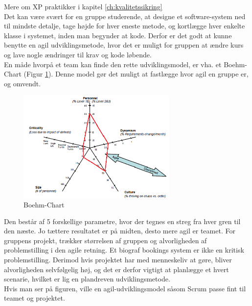 Mere om XP praktikker i kapitel \ref{ch:kvalitetssikring}\\

Det kan være svært for en gruppe studerende, at designe et software-system ned til mindste detalje, 
tage højde for hver eneste metode, og kortlægge hver enkelte klasse i systemet, inden man begynder at kode. 
Derfor er det godt at kunne benytte en agil udviklingsmetode, hvor det er muligt for gruppen at ændre kurs og 
lave nogle ændringer til krav og kode løbende. \\
En måde hvorpå et team kan finde den rette udviklingsmodel, er vha. et Boehm-Chart (Figur \ref{fig:Boehm}). 
Denne model gør det muligt at fastlægge hvor agil en gruppe er, og omvendt. \\

\begin{figure}[h]
    \centering
    \includegraphics[width=0.7\textwidth]{figures/Boehm-chart.png}
    \caption{Boehm-Chart}
    \label{fig:Boehm}
\end{figure}

Den består af 5 forskellige parametre, hvor der tegnes en streg fra hver gren til den næste. 
Jo tættere resultatet er på midten, desto mere agil er teamet. 
For gruppens projekt, trækker størrelsen af gruppen og alvorligheden af problemstilling i den agile retning. 
Et biograf bookings system er ikke en kritisk problemstilling. Derimod hvis projektet har med menneskeliv at gøre, 
bliver alvorligheden selvfølgelig høj, og det er derfor vigtigt at planlægge et hvert scenarie, 
hvilket er lig en plandreven udviklingsmetode.\\

Hvis man ser på figuren, ville en agil-udviklingsmodel såsom Scrum passe fint til teamet og projektet. 
